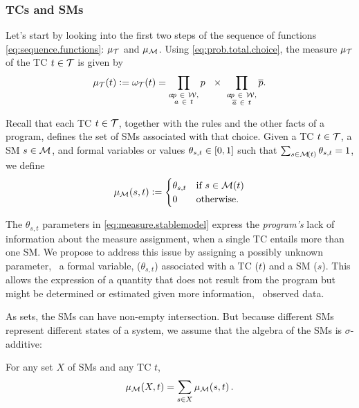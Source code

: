 \documentclass[x11names]{tlp}
\begin{document}
\subsubsection*{\Aclp{TC} and \Aclp{SM}}
\label{par:prop.totalchoices}

Let's start by looking into the first two steps of the sequence of functions \cref{eq:sequence.functions}: $\pwT$ and $\pwM$.
Using \cref{eq:prob.total.choice}, the measure $\mu_{\cal T}$ of the \acl{TC} $t
	\in \TCHOICEset$ is given by
\begin{equation}
	\pwt{t} := \wgtT\at{t}=
	\prod_{\substack{
			\weightfact{a}{p}~ \in ~\WEIGHTFset,%
	\\
			a~ \in~ t}} p\ \ \times\
	\prod_{\substack{
			\weightfact{a}{p}~ \in ~\WEIGHTFset,%
	\\
			\co{a}~\in~ t}} \co{p}.
	\label{eq:measure.tchoice}
\end{equation}

Recall that each \acl{TC} $t \in \TCHOICEset$, together with the rules and the other facts of a program, defines the set  of \aclp{SM} associated with that choice.
Given a \acl{TC} $t \in \TCHOICEset$, a \acl{SM}
$s \in \MODELset $, and formal variables or values $\theta_{s,t} \in
	\intcc{0, 1}$ such that $\sum_{s\in \tcgen{t}} \theta_{s,t} = 1$, we define
\begin{equation}
	\pwm{s, t} := \begin{cases}
		              \theta_{s,t} & \text{if~} s \in \tcgen{t}\cr 0 & \text{otherwise.}
	              \end{cases}
	\label{eq:measure.stablemodel}
\end{equation}

The $\theta_{s,t}$ parameters in \cref{eq:measure.stablemodel} express the \emph{program's} lack of information about the measure assignment, when a single \acl{TC} entails more than one \acl{SM}.
We propose to address this issue by assigning a possibly unknown parameter, \ie~a formal variable, ($\theta_{s,t}$) associated with a \acl{TC} ($t$) and a \acl{SM}
($s$).
This allows the expression of a quantity that does not result from the program but might be determined or estimated given more information, \eg\ observed data.

As sets, the \aclp{SM} can have non-empty intersection.
But because different \acp{SM} represent different states of a system, we assume that the algebra of the \aclp{SM} is $\sigma$-additive:

\begin{assumption}
	\label{assumption:smodels.disjoint}%

	For any set $X$ of \aclp{SM} and any \acl{TC} $t$,
	\begin{equation}
		\pwM\at{X, t} = \sum_{s\in X}\pwM\at{s, t}.\label{eq:smodels.disjoint}
	\end{equation}

\end{assumption}
\end{document}
